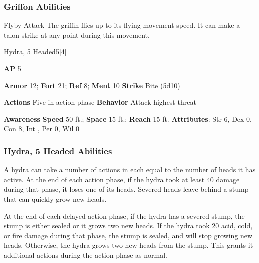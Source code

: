\subsubsection{Griffon Abilities}

\begin{ability}{Flyby Attack}
The griffin flies up to its flying movement speed.
It can make a talon strike at any point during this movement.
\end{ability}

\begin{monsection}{Hydra, 5 Headed}{5}[4]
\vspace{-1em}\vspace{-1em}
\begin{spellcontent}
\begin{spelltargetinginfo}
{\textbf{AP} 5}

\pari \textbf{Armor} 12;
\textbf{Fort} 21;
\textbf{Ref} 8;
\textbf{Ment} 10
\pari \textbf{Strike} Bite  (5d10)


\pari \textbf{Actions} Five in action phase
\pari \textbf{Behavior} Attack highest threat
\end{spelltargetinginfo}
\end{spellcontent}

\begin{monsterfooter}
\pari \textbf{Awareness} 
\pari \textbf{Speed} 50 ft.;
\textbf{Space} 15 ft.;
\textbf{Reach} 15 ft.
\pari \textbf{Attributes}:
Str 6,
Dex 0,
Con 8,
Int ,
Per 0,
Wil 0
\end{monsterfooter}
\end{monsection}


\subsubsection{Hydra, 5 Headed Abilities}

A hydra can take a number of actions in each  equal to the number of heads it has active.
At the end of each action phase, if the hydra took at least 40 damage during that phase, it loses one of its heads.
Severed heads leave behind a stump that can quickly grow new heads.

At the end of each delayed action phase, if the hydra has a severed stump, the stump is either sealed or it grows two new heads.
If the hydra took 20 acid, cold, or fire damage during that phase, the stump is sealed, and will stop growing new heads.
Otherwise, the hydra grows two new heads from the stump.
This grants it additional actions during the action phase as normal.

